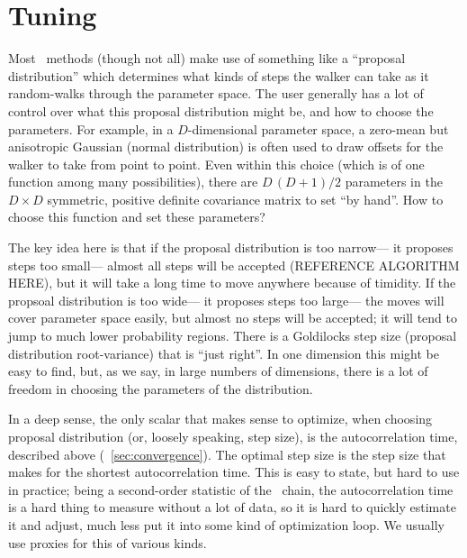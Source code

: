 \documentclass[12pt,twoside,pdftex]{article}
\newcommand{\MCMC}{\acronym{MCMC}}
\begin{document}
\section{Tuning}\label{sec:tuning}

Most \MCMC\ methods
  (though not all)
  make use of something like a ``proposal distribution''
  which determines what kinds of steps the walker can take
  as it random-walks through the parameter space.
The user generally has a lot of control over what this proposal distribution might be,
  and how to choose the parameters.
For example, in a $D$-dimensional parameter space, %
  a zero-mean but anisotropic Gaussian (normal distribution)
  is often used to draw offsets for the walker to take from point to point.
Even within this choice (which is of one function among many possibilities),
  there are $D\,(D+1)/2$ parameters in the $D\times D$ symmetric, positive definite covariance matrix
  to set ``by hand''.
How to choose this function and set these parameters?

The key idea here is that if the proposal distribution is too narrow---%
  it proposes steps too small---%
  almost all steps will be accepted (REFERENCE ALGORITHM HERE),
  but it will take a long time to move anywhere because of timidity.
If the propsoal distribution is too wide---%
  it proposes steps too large---%
  the moves will cover parameter space easily,
  but almost no steps will be accepted;
  it will tend to jump to much lower probability regions.
There is a Goldilocks step size (proposal distribution root-variance) that is ``just right''.
In one dimension this might be easy to find,
  but, as we say, in large numbers of dimensions,
  there is a lot of freedom in choosing the parameters of the distribution.
  

In a deep sense, the only scalar that makes sense to optimize,
  when choosing proposal distribution (or, loosely speaking, step size),
  is the autocorrelation time, described above (\sectionname~\ref{sec:convergence}).
The optimal step size is the step size that makes for the shortest autocorrelation time.
This is easy to state, but hard to use in practice;
  being a second-order statistic of the \MCMC\ chain,
  the autocorrelation time is a hard thing to measure without a lot of data,
  so it is hard to quickly estimate it and adjust,
  much less put it into some kind of optimization loop.
We usually use proxies for this of various kinds.
\end{document}
